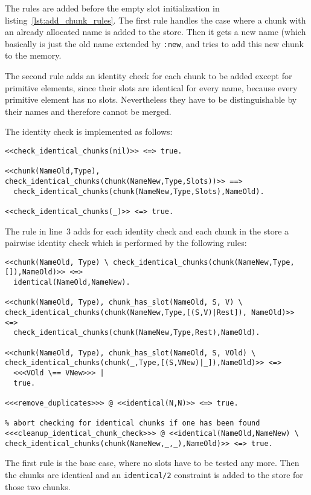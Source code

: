 The rules are added before the empty slot initialization in listing~\ref{lst:add_chunk_rules}. The first rule handles the case where a chunk with an already allocated name is added to the store. Then it gets a new name (which basically is just the old name extended by \lstinline|:new|, and tries to add this new chunk to the memory. 

The second rule adds an identity check for each chunk to be added except for primitive elements, since their slots are identical for every name, because every primitive element has no slots. Nevertheless they have to be distinguishable by their names and therefore cannot be merged.

The identity check is implemented as follows:

\begin{lstlisting}
<<check_identical_chunks(nil)>> <=> true.

<<chunk(NameOld,Type), check_identical_chunks(chunk(NameNew,Type,Slots))>> ==> 
  check_identical_chunks(chunk(NameNew,Type,Slots),NameOld).
  
<<check_identical_chunks(_)>> <=> true.
\end{lstlisting}

The rule in line~3 adds for each identity check and each chunk in the store a pairwise identity check which is performed by the following rules:

\begin{lstlisting}
<<chunk(NameOld, Type) \ check_identical_chunks(chunk(NameNew,Type,[]),NameOld)>> <=> 
  identical(NameOld,NameNew).
  
<<chunk(NameOld, Type), chunk_has_slot(NameOld, S, V) \ check_identical_chunks(chunk(NameNew,Type,[(S,V)|Rest]), NameOld)>> <=> 
  check_identical_chunks(chunk(NameNew,Type,Rest),NameOld).
  
<<chunk(NameOld, Type), chunk_has_slot(NameOld, S, VOld) \ check_identical_chunks(chunk(_,Type,[(S,VNew)|_]),NameOld)>> <=> 
  <<<VOld \== VNew>>> |
  true.
    
<<<remove_duplicates>>> @ <<identical(N,N)>> <=> true.

% abort checking for identical chunks if one has been found
<<<cleanup_identical_chunk_check>>> @ <<identical(NameOld,NameNew) \ check_identical_chunks(chunk(NameNew,_,_),NameOld)>> <=> true.
\end{lstlisting}

The first rule is the base case, where no slots have to be tested any more. Then the chunks are identical and an \lstinline|identical/2| constraint is added to the store for those two chunks.

